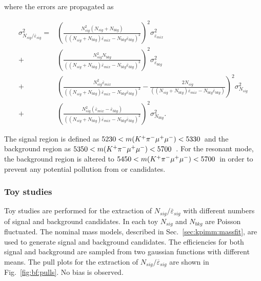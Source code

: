 \noindent where the errors are propagated as
 
\begin{equation}
\begin{aligned}
\sigma_{N_{sig}/\overline{\varepsilon}_{sig}}^{2} =&
\left(\frac{N_{sig}^{2}(N_{sig}+N_{bkg})}{((N_{sig}+N_{bkg})\overline{\varepsilon}_{mix} -  N_{bkg}\overline{\varepsilon}_{bkg})^2}\right)^{2}\sigma_{\overline{\varepsilon}_{mix}}^{2}\\
+& \left(\frac{N_{sig}^{2}N_{bkg}}{((N_{sig}+N_{bkg})\overline{\varepsilon}_{mix} -  N_{bkg}\overline{\varepsilon}_{bkg})^2}\right)^{2}\sigma_{\overline{\varepsilon}_{bkg}}^{2}\\
+& \left(\frac{N_{sig}^{2}\overline{\varepsilon}_{mix}}{((N_{sig}+N_{bkg})\overline{\varepsilon}_{mix} -  N_{bkg}\overline{\varepsilon}_{bkg})^2} - \frac{2N_{sig}}{((N_{sig}+N_{bkg})\overline{\varepsilon}_{mix} -  N_{bkg}\overline{\varepsilon}_{bkg})} \right)^{2}\sigma_{N_{sig}}^{2}\\
+& \left(\frac{N_{sig}^{2}(\overline{\varepsilon}_{mix} - \overline{\varepsilon}_{bkg})}{((N_{sig}+N_{bkg})\overline{\varepsilon}_{mix} -  N_{bkg}\overline{\varepsilon}_{bkg})^2}\right)^{2}\sigma_{N_{bkg}}^{2}.
\end{aligned}
\end{equation}
 
The signal region is defined as $5230<m({{K}^+}{{\pi}^-}{\mu^+}{\mu^-})<5330$~\mevcc and the background region as $5350<m({{K}^+}{{\pi}^-}{\mu^+}{\mu^-})<5700$~\mevcc. For the resonant mode, the background region is altered to $5450<m({{K}^+}{{\pi}^-}{\mu^+}{\mu^-})<5700$~\mevcc in order to prevent any potential pollution from \BdToJPsiKst or \BsToJPsiKst candidates.

\subsubsection{Toy studies}
 
Toy studies are performed for the extraction of $N_{sig}/\overline{\varepsilon}_{sig}$ with different numbers of signal and background candidates.  In each toy $N_{sig}$ and $N_{bkg}$ are Poisson fluctuated.  The nominal mass models, described in Sec.~\ref{sec:kpimm:massfit}, are used to generate signal and background candidates. The efficiencies for both signal and background are sampled from two gaussian functions with different means.  The pull plots for the extraction of $N_{sig}/\overline{\varepsilon}_{sig}$ are shown in Fig.~\ref{fig:bf:pulls}. No bias is observed.
 

